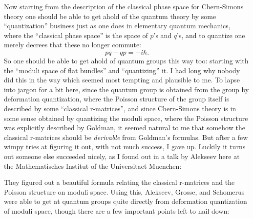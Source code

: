 \documentclass{article}
\def\tightlist{}
\renewcommand{\texttt}[1]{%
  \begingroup
  \ttfamily
  \begingroup\lccode`~=`/\lowercase{\endgroup\def~}{/\discretionary{}{}{}}%
  \begingroup\lccode`~=`[\lowercase{\endgroup\def~}{[\discretionary{}{}{}}%
  \begingroup\lccode`~=`.\lowercase{\endgroup\def~}{.\discretionary{}{}{}}%
  \catcode`/=\active\catcode`[=\active\catcode`.=\active
  \scantokens{#1\noexpand}%
  \endgroup
}
\begin{document}
Now starting from the description of the classical phase space for
Chern-Simons theory one should be able to get ahold of the quantum
theory by some ``quantization'' business just as one does in elementary
quantum mechanics, where the ``classical phase space'' is the space of
\(p\)'s and \(q\)'s, and to quantize one merely decrees that these no
longer commute: \[pq-qp = -i \hbar.\] So one should be able to get ahold
of quantum groups this way too: starting with the ``moduli space of flat
bundles'' and ``quantizing'' it. I had long why nobody did this in the
way which seemed most tempting and plausible to me. To lapse into jargon
for a bit here, since the quantum group is obtained from the group by
deformation quantization, where the Poisson structure of the group
itself is described by some ``classical r-matrices'', and since
Chern-Simons theory is in some sense obtained by quantizing the moduli
space, where the Poisson structure was explicitly described by Goldman,
it seemed natural to me that somehow the classical r-matrices should be
\emph{derivable} from Goldman's formulas. But after a few wimpy tries at
figuring it out, with not much success, I gave up. Luckily it turns out
someone else succeeded nicely, as I found out in a talk by Alekseev here
at the Mathematisches Institut of the Universitaet Muenchen:


They figured out a beautiful formula relating the classical r-matrices
and the Poisson structure on moduli space. Using this, Alekseev, Grosse,
and Schomerus were able to get at quantum groups quite directly from
deformation quantization of moduli space, though there are a few
important points left to nail down:

\end{document}
